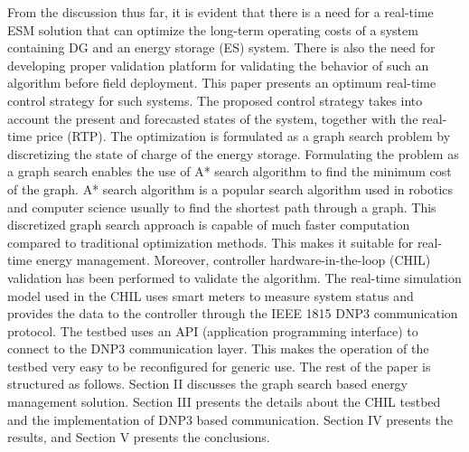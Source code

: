 From the discussion thus far, it is evident that there is a need for a real-time ESM solution that can optimize the long-term operating costs of a system containing DG and an energy storage (ES) system. There is also the need for developing proper validation platform for validating the behavior of such an algorithm before field deployment.  This paper presents an optimum real-time control strategy for such systems. The proposed control strategy takes into account the present and forecasted states of the system, together with the real-time price (RTP). The optimization is formulated as a graph search problem by discretizing the state of charge of the energy storage. Formulating the problem as a graph search enables the use of A* search algorithm to find the minimum cost of the graph. A* search algorithm \cite{a8book} is a popular search algorithm used in robotics and computer science usually to find the shortest path through a graph. This discretized graph search approach is capable of much faster computation compared to traditional optimization methods. This makes it suitable for real-time energy management.
Moreover, controller hardware-in-the-loop (CHIL) validation has been performed to validate the algorithm. The real-time simulation model used in the CHIL uses smart meters to measure system status and provides the data to the controller through the IEEE 1815 DNP3 communication protocol. The testbed uses an API (application programming interface) to connect to the DNP3 communication layer. This makes the operation of the testbed very easy to be reconfigured for generic use. The rest of the paper is structured as follows. Section II discusses the graph search based energy management solution. Section III  presents the details about the CHIL testbed and the implementation of DNP3 based communication. Section IV presents the results, and Section V presents the conclusions.


